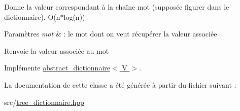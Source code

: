 Donne la valeur correspondant à la chaîne mot (supposée figurer dans le dictionnaire). O(n$\ast$log(n)) 


\begin{DoxyParams}{Paramètres}
{\em mot} & \-: le mot dont on veut récupérer la valeur associée \\
\hline
\end{DoxyParams}
\begin{DoxyReturn}{Renvoie}
la valeur associée au mot 
\end{DoxyReturn}


Implémente \hyperlink{classabstract__dictionnaire_abf2426d66e5499582dc4dc4fe5eeb1c3}{abstract\-\_\-dictionnaire$<$ V $>$}.



La documentation de cette classe a été générée à partir du fichier suivant \-:\begin{DoxyCompactItemize}
\item 
src/\hyperlink{tree__dictionnaire_8hpp}{tree\-\_\-dictionnaire.\-hpp}\end{DoxyCompactItemize}
